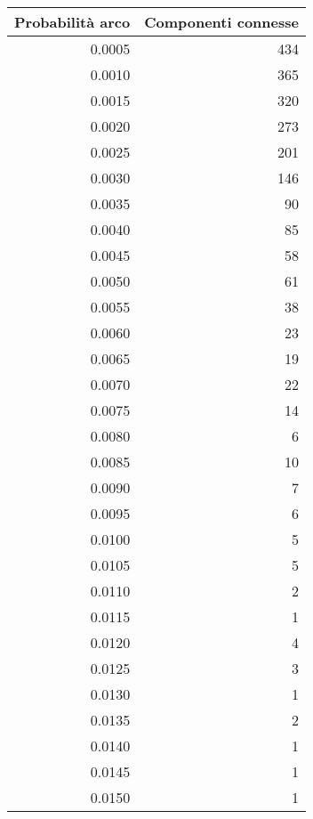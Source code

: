 \begin{tabular}{rr}
\toprule
 Probabilità arco &  Componenti connesse \\
\midrule
           0.0005 &                  434 \\
           0.0010 &                  365 \\
           0.0015 &                  320 \\
           0.0020 &                  273 \\
           0.0025 &                  201 \\
           0.0030 &                  146 \\
           0.0035 &                   90 \\
           0.0040 &                   85 \\
           0.0045 &                   58 \\
           0.0050 &                   61 \\
           0.0055 &                   38 \\
           0.0060 &                   23 \\
           0.0065 &                   19 \\
           0.0070 &                   22 \\
           0.0075 &                   14 \\
           0.0080 &                    6 \\
           0.0085 &                   10 \\
           0.0090 &                    7 \\
           0.0095 &                    6 \\
           0.0100 &                    5 \\
           0.0105 &                    5 \\
           0.0110 &                    2 \\
           0.0115 &                    1 \\
           0.0120 &                    4 \\
           0.0125 &                    3 \\
           0.0130 &                    1 \\
           0.0135 &                    2 \\
           0.0140 &                    1 \\
           0.0145 &                    1 \\
           0.0150 &                    1 \\

\end{tabular}
